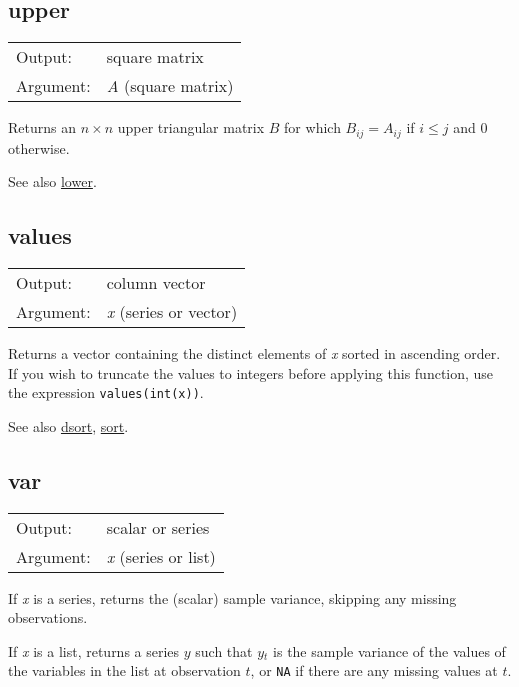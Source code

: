 \subsection{upper}
\hypertarget{func-upper}{}

\begin{tabular}{ll}
Output:     & square matrix\\
Argument:   & \textsl{A} (square matrix)\\
\end{tabular}

	  Returns an $n\times n$ upper triangular matrix \ensuremath{B}
	  for which $B_{ij} = A_{ij}$ if $i \le j$ and 0 otherwise.

	  See also \hyperlink{func-lower}{lower}.

\subsection{values}
\hypertarget{func-values}{}

\begin{tabular}{ll}
Output:     & column vector\\
Argument:   & \textsl{x} (series or vector)\\
\end{tabular}

	  Returns a vector containing the distinct elements of
	  \textsl{x} sorted in ascending order.  If you wish to
	  truncate the values to integers before applying this function,
	  use the expression \texttt{values(int(x))}.

	  See also \hyperlink{func-dsort}{dsort}, \hyperlink{func-sort}{sort}.

\subsection{var}
\hypertarget{func-var}{}

\begin{tabular}{ll}
Output:     & scalar or series\\
Argument:   & \textsl{x} (series or list)\\
\end{tabular}

	  If \textsl{x} is a series, returns the (scalar) sample
	  variance, skipping any missing observations.

	  If \textsl{x} is a list, returns a series \ensuremath{y}
	  such that \ensuremath{y}\ensuremath{_{t}} is the sample variance of the
	  values of the variables in the list at observation \ensuremath{t},
	  or \texttt{NA} if there are any missing values at \ensuremath{t}.


